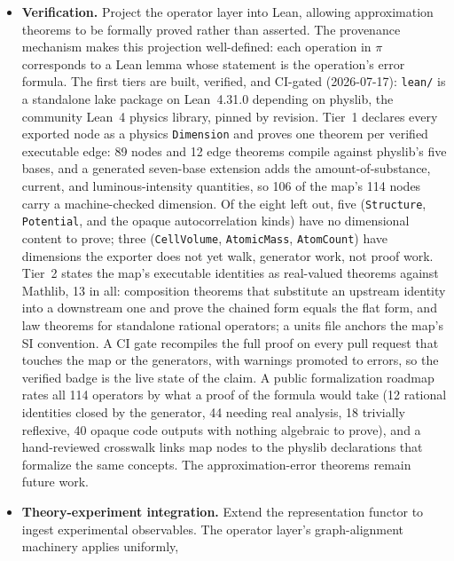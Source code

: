 \documentclass[11pt,a4paper]{article}
\begin{document}
\begin{itemize}[leftmargin=2em]
  \item \textbf{Verification.} Project the operator layer into Lean, allowing
        approximation theorems to be formally proved rather than asserted. The
        provenance mechanism makes this projection well-defined: each operation in $\pi$
        corresponds to a Lean lemma whose statement is the operation's error formula.
        The first tiers are built, verified, and CI-gated (2026-07-17): \texttt{lean/}
        is a standalone lake package on Lean~4.31.0 depending on physlib, the
        community Lean~4 physics library, pinned by revision. Tier~1 declares every
        exported node as a physics \texttt{Dimension} and proves one theorem per
        verified executable edge: 89 nodes and 12 edge theorems compile against
        physlib's five bases, and a generated seven-base extension adds the
        amount-of-substance, current, and luminous-intensity quantities, so 106 of
        the map's 114 nodes carry a machine-checked dimension. Of the eight left
        out, five (\texttt{Structure}, \texttt{Potential}, and the opaque
        autocorrelation kinds) have no dimensional content to prove; three
        (\texttt{CellVolume}, \texttt{AtomicMass}, \texttt{AtomCount}) have
        dimensions the exporter does not yet walk, generator work, not proof
        work. Tier~2
        states the map's executable identities as real-valued theorems against
        Mathlib, 13 in all: composition theorems that substitute an upstream identity
        into a downstream one and prove the chained form equals the flat form, and
        law theorems for standalone rational operators; a units file anchors the
        map's SI convention. A CI gate recompiles the full proof on every pull
        request that touches the map or the generators, with warnings promoted to
        errors, so the verified badge is the live state of the claim. A public
        formalization roadmap rates all 114 operators by what a proof of the formula
        would take (12 rational identities closed by the generator, 44 needing real
        analysis, 18 trivially reflexive, 40 opaque code outputs with nothing
        algebraic to prove), and a hand-reviewed crosswalk links map nodes to the
        physlib declarations that formalize the same concepts. The
        approximation-error theorems remain future work.
  \item \textbf{Theory-experiment integration.} Extend the representation functor to ingest
        experimental observables. The operator layer's graph-alignment machinery applies uniformly,

\end{itemize}
\end{document}
